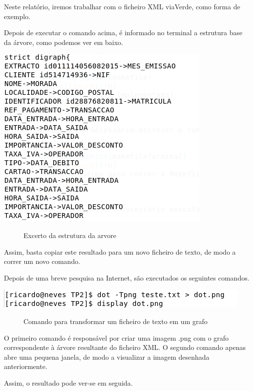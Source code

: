\documentclass[a4paper]{article}
\begin{document}
Neste relatório, iremos trabalhar com o ficheiro XML viaVerde, como forma de exemplo.

Depois de executar o comando acima, é informado no terminal a estrutura base da árvore, como podemos ver em baixo.

\begin{center}
	\includegraphics{arvore}
	\begin{figure}[!h]
	\caption{Excerto da estrutura da arvore}
	\end{figure}
\end{center}

Assim, basta copiar este resultado para um novo ficheiro de texto, de modo a correr um novo comando.

Depois de uma breve pesquisa na Internet, são executados os seguintes comandos.

\begin{center}
	\includegraphics[scale=0.8]{comandoDot}
	\begin{figure}[!h]
	\caption{Comando para transformar um ficheiro de texto em um grafo}
	\end{figure}
\end{center}

O primeiro comando é responsável por criar uma imagem .png com o grafo correspondente à árvore resultante do ficheiro XML.
O segundo comando apenas abre uma pequena janela, de modo a visualizar a imagem desenhada anteriormente.

Assim, o resultado pode ver-se em seguida.
\end{document}
